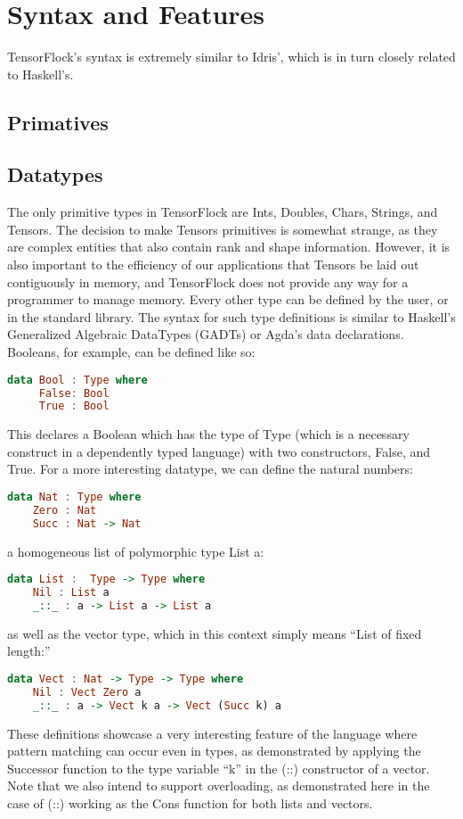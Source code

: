 \documentclass[12pt]{article}
\begin{document}
\section{Syntax and Features}
TensorFlock's syntax is extremely similar to Idris', which is in turn closely related to Haskell's.
\subsection{Primatives}
\subsection{Datatypes}
The only primitive types in TensorFlock are Ints, Doubles, Chars, Strings, and Tensors. The decision to make Tensors primitives is somewhat strange, as they are complex entities that also contain rank and shape information. However, it is also important to the efficiency of our applications that Tensors be laid out contiguously in memory, and TensorFlock does not provide any way for a programmer to manage memory. 
Every other type can be defined by the user, or in the standard library. The syntax for such type definitions is similar to Haskell's Generalized Algebraic DataTypes (GADTs) or Agda's data declarations. Booleans, for example, can be defined like so:
\begin{lstlisting}[language=Haskell]
data Bool : Type where
     False: Bool
     True : Bool
\end{lstlisting}
This declares a Boolean which has the type of Type (which is a necessary construct in a dependently typed language) with two constructors, False, and True. For a more interesting datatype, we can define the natural numbers:
\begin{lstlisting}[language=Haskell]
data Nat : Type where
    Zero : Nat
    Succ : Nat -> Nat
\end{lstlisting}
 a homogeneous list of polymorphic type List a:
\begin{lstlisting}[language=Haskell]
data List :  Type -> Type where
    Nil : List a    
    _::_ : a -> List a -> List a
\end{lstlisting}
as well as the vector type, which in this context simply means ``List of fixed length:''
\begin{lstlisting}[language=Haskell]
data Vect : Nat -> Type -> Type where
    Nil : Vect Zero a
    _::_ : a -> Vect k a -> Vect (Succ k) a
\end{lstlisting}
These definitions showcase a very interesting feature of the language where pattern matching can occur even in types, as demonstrated by applying the Successor function to the type variable ``k'' in the (::) constructor of a vector. Note that we also intend to support overloading, as demonstrated here in the case of (::) working as the Cons function for both lists and vectors.
\end{document}
